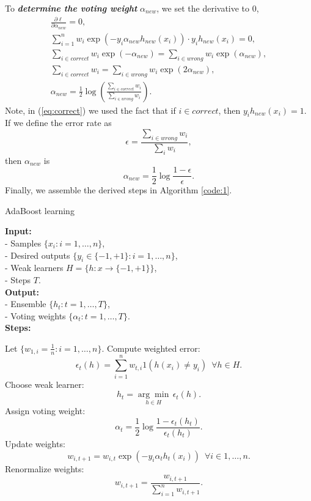 \documentclass[11pt]{article}
\begin{document}
To \textit{\textbf{determine the voting weight}} $\alpha_{new}$, we set the derivative to 0,
\begin{gather}
\frac{\partial\ell}{\partial\alpha_{new}} = 0,\\
\sum_{i=1}^n w_i\exp(-y_i\alpha_{new}h_{new}(x_i))\cdot y_i h_{new}(x_i) = 0,\\
\sum_{i\in correct} w_i\exp(-\alpha_{new}) = \sum_{i\in wrong} w_i\exp(\alpha_{new}),\label{eq:correct}\\
\sum_{i\in correct} w_i = \sum_{i\in wrong} w_i \exp(2\alpha_{new}),\\
\alpha_{new} = \frac{1}{2}\log\left( \frac{\sum_{i\in correct} w_i }{\sum_{i\in wrong} w_i} \right).
\end{gather}
Note, in (\ref{eq:correct}) we used the fact that if $i\in correct$, then $y_ih_{new}(x_i)=1$. If we define the error rate as
\begin{equation}
\epsilon = \frac{\sum_{i\in wrong}w_i}{\sum_i w_i},
\end{equation}
then $\alpha_{new}$ is
\begin{equation}
\alpha_{new} = \frac{1}{2} \log \frac{1-\epsilon}{\epsilon}.
\end{equation}
Finally, we assemble the derived steps in Algorithm \ref{code:1}.
\begin{algorithm}[h]
	\caption{AdaBoost learning}
	\label{code:1}
	{
		\textbf{Input:} \\
		- Samples $\{x_i : i=1,\ldots,n\}$,\\
		- Desired outputs $\{y_i \in \{-1,+1\} : i=1,\ldots,n\}$,\\
		- Weak learners $H=\{ h : x \rightarrow \{ -1,+1 \} \}$,\\
		- Steps $T$.\\
		
		\textbf{Output:} \\
		- Ensemble $\{h_t : t = 1,\ldots,T\}$,\\
		- Voting weights $\{\alpha_t : t = 1,\ldots,T\}$.\\
		
		\textbf{Steps:}
		\begin{algorithmic}[1]
			\STATE Let $\{w_{1,i} =\frac{1}{n} : i=1,\ldots,n\}$.
				\STATE Compute weighted error: \[\epsilon_t(h) = \sum_{i=1}^n w_{t,i}1(h(x_i) \neq y_i) \,\,\,\forall h\in H.\]
				\STATE Choose weak learner: \[h_t = \underset{h\in H}{\arg\min}\, \epsilon_t(h).\]
				\STATE Assign voting weight: \[\alpha_{t} = \frac{1}{2} \log \frac{1-\epsilon_t(h_t)}{\epsilon_t(h_t)}.\]
				\STATE Update weights: \[ w_{i,t+1} = w_{i,t} \exp\left(-y_i \alpha_t h_t(x_i) \right) \,\,\,\forall i\in1,\ldots,n.\]
				\STATE Renormalize weights: \[ w_{i,t+1} = \frac{w_{i,t+1}}{\sum_{i=1}^n w_{i,t+1}}.  \]
			\ENDFOR
		\end{algorithmic}
	}
\end{algorithm}
\end{document}
